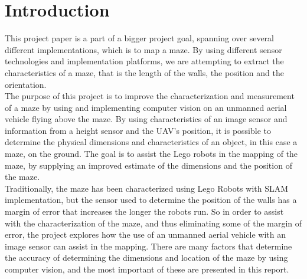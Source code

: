 \section*{Introduction}
This project paper is a part of a bigger project goal, spanning over several different implementations, which is to map a maze. By using different sensor technologies and implementation platforms, we are attempting to extract the characteristics of a maze, that is the length of the walls, the position and the orientation. \\

The purpose of this project is to improve the characterization and measurement of a maze by using and implementing computer vision on an unmanned aerial vehicle flying above the maze. By using characteristics of an image sensor and information from a height sensor and the UAV's position, it is possible to determine the physical dimensions and characteristics of an object, in this case a maze, on the ground. The goal is to assist the Lego robots in the mapping of the maze, by supplying an improved estimate of the dimensions and the position of the maze. \\

Traditionally, the maze has been characterized using Lego Robots with SLAM implementation, but the sensor used to determine the position of the walls has a margin of error that increases the longer the robots run. So in order to assist with the characterization of the maze, and thus eliminating some of the margin of error, the project explores how the use of an unmanned aerial vehicle with an image sensor can assist in the mapping. There are many factors that determine the accuracy of determining the dimensions and location of the maze by using computer vision, and the most important of these are presented in this report.